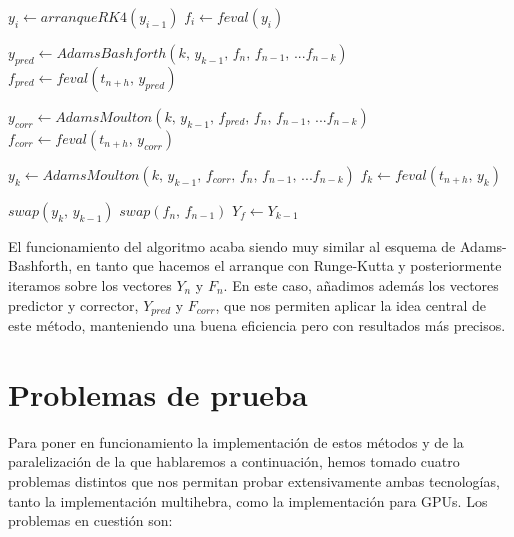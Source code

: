 \begin{algorithm}[H] %
	\begin{algorithmic}
			\State $y_i \gets arranqueRK4(y_{i-1})$
		\EndFor
			\State $f_i \gets feval(y_i)$
		\EndFor

			\State $y_{pred} \gets AdamsBashforth(k\text{, }y_{k-1}\text{, }f_n\text{, }f_{n-1}\text{, }...f_{n-k})$ 			
			\State $f_{pred} \gets feval(t_{n+h} \text{, } y_{pred})$
			
			\State $y_{corr} \gets AdamsMoulton(k\text{, }y_{k-1}\text{, }f_{pred}\text{, }f_n\text{, }f_{n-1}\text{, }...f_{n-k})$ 
			\State $f_{corr} \gets feval(t_{n+h} \text{, } y_{corr})$
			
			\State $y_k \gets AdamsMoulton(k\text{, } y_{k-1} \text{, } f_{corr}\text{, }f_n\text{, }f_{n-1}\text{, }...f_{n-k})$
			\State $f_k \gets feval(t_{n+h} \text{, } y_k)$
			
			\State $swap(y_k \text{, } y_{k-1})$
				\State $swap(f_n \text{, } f_{n-1})$
			\EndFor
		\EndFor
		\State $Y_f \gets Y_{k-1}$
	\end{algorithmic}
	\caption{Adams-Bashforth-Moulton de orden k}
	\label{alg:AdamsBashforthMoulton}
\end{algorithm}

El funcionamiento del algoritmo acaba siendo muy similar al esquema de Adams-Bashforth, en tanto que hacemos el arranque con Runge-Kutta y posteriormente iteramos sobre los vectores $Y_n$ y $F_n$. En este caso, añadimos además los vectores predictor y corrector, $Y_{pred}$ y $F_{corr}$, que nos permiten aplicar la idea central de este método, manteniendo una buena eficiencia pero con resultados más precisos.

\section{Problemas de prueba}
\label{sec:problemas}

Para poner en funcionamiento la implementación de estos métodos y de la paralelización de la que hablaremos a continuación, hemos tomado cuatro problemas distintos que nos permitan probar extensivamente ambas tecnologías, tanto la implementación multihebra, como la implementación para GPUs. Los problemas en cuestión son:

